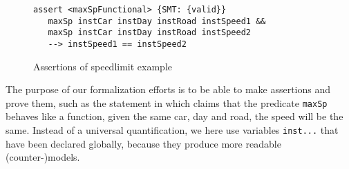 \begin{figure}[h]
\begin{lstlisting}
assert <maxSpFunctional> {SMT: {valid}}
   maxSp instCar instDay instRoad instSpeed1 &&
   maxSp instCar instDay instRoad instSpeed2
   --> instSpeed1 == instSpeed2
\end{lstlisting}
  \caption{Assertions of speedlimit example}\label{fig:assertions}
\end{figure}


The purpose of our formalization efforts is to be able to make assertions
and prove them, such as the statement in  which claims
that the predicate 
\texttt{maxSp} behaves like a function, \ie{} given the same car, day and
road, the speed will be the same. Instead of a universal quantification, we
here use variables \texttt{inst...} that have been declared globally, because they
produce more readable (counter-)models. 


